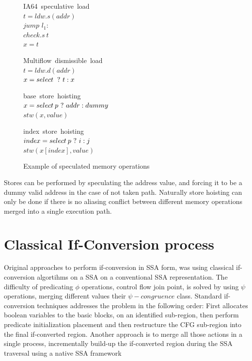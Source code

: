 \begin{figure}
\begin{minipage}[t]{4cm}
\mbox{IA64 speculative load} \\
$t = ldw.s(addr) $ \\
$jump$ $l_1:$ \\
$check.s\:t$ \\
$x = t$ \\
\end{minipage}
\begin{minipage}[t]{4cm}
\mbox{Multiflow dismissible load} \\
$t = ldw.d(addr) $ \\
$x = select\: ~?~ t : x $ \\
\end{minipage}

\begin{minipage}[t]{4cm}
\mbox{base store hoisting} \\
$x=select\:p ~?~ addr : dummy $ \\
$stw (x, value) $ \\
\end{minipage}
\begin{minipage}[t]{4cm}
\mbox{index store hoisting} \\
$index=select\:p ~?~ i : j $ \\
$stw (x[index], value) $ \\
\end{minipage}
\label{fig:spec}
\caption{Example of speculated memory operations}
\end{figure}

Stores can be performed by speculating the address value, and forcing it to be a dummy valid address in the case of not taken path. Naturally store hoisting can only be done if there is no aliasing conflict between different memory operations merged into a single execution path.

\section{Classical If-Conversion process}

Original approaches to perform if-conversion in SSA form, was using classical if-conversion algortihms on a SSA on a conventional SSA representation. The difficulty of predicating $\phi$ operations, control flow join point, is solved by using $\psi$ operations, merging different values their $\psi-congruence$ class. 
Standard if-conversion techniques addresses the problem in the following order: First allocates boolean variables to the basic blocks, on an identified sub-region, then perform predicate initialization placement and then restructure the CFG sub-region into the final if-converted region. 
 Another approach is to merge all those actions in a single process, incrementally build-up the if-converted region during the SSA traversal using a native SSA framework 

